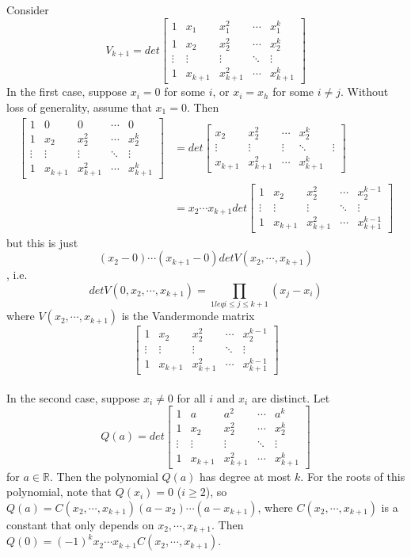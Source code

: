 \documentclass[12pt]{article}
\begin{document}
Consider 
$$V_{k+1} = det \begin{bmatrix} 1 & x_1 & x_1^2 & \cdots & x_1^{k} \\ 1 &x_2 & x_2^2 & \cdots & x_2^{k} \\ \vdots & \vdots & \vdots & \ddots & \vdots \\ 1 &x_{k+1} & x_{k+1}^2 & \cdots & x_{k+1}^{k} \end{bmatrix}$$
In the first case, suppose $x_i = 0$ for some $i$, or $x_i = x_h$ for some $i \neq j$. Without loss of generality, assume that $x_1 = 0$. Then 
\begin{align*} 
\begin{bmatrix} 1 & 0 & 0 & \cdots & 0 \\ 1 &x_2 & x_2^2 & \cdots & x_2^{k} \\ \vdots & \vdots & \vdots & \ddots & \vdots \\ 1 &x_{k+1} & x_{k+1}^2 & \cdots & x_{k+1}^{k} \end{bmatrix} &= det \begin{bmatrix} x_2 & x_2^2 & \cdots & x_2^{k} \\ \vdots & \vdots & \vdots & \ddots & \vdots \\ x_{k+1} & x_{k+1}^2 & \cdots & x_{k+1}^{k} \end{bmatrix}\\
&= x_2 \cdots x_{k+1} det \begin{bmatrix} 1 &x_2 & x_2^2 & \cdots & x_2^{k-1} \\ \vdots & \vdots & \vdots & \ddots & \vdots \\ 1 & x_{k+1} & x_{k+1}^2 & \cdots & x_{k+1}^{k-1} \end{bmatrix}
\end{align*}
but this is just
$$(x_2 - 0) \cdots (x_{k+1} - 0) det V(x_2, \cdots, x_{k+1}) $$,
i.e.
$$det V(0, x_2, \cdots, x_{k+1}) = \prod_{1 leq i \leq j \leq k+1}(x_j - x_i)$$
where $V(x_2, \cdots, x_{k+1})$ is the Vandermonde matrix 
$$\begin{bmatrix} 1 &x_2 & x_2^2 & \cdots & x_2^{k-1} \\ \vdots & \vdots & \vdots & \ddots & \vdots \\ 1 & x_{k+1} & x_{k+1}^2 & \cdots & x_{k+1}^{k-1} \end{bmatrix}$$\\

In the second case, suppose $x_i \neq 0$ for all $i$ and $x_i$ are distinct. Let
$$Q(a) = det \begin{bmatrix} 1 & a & a^2 & \cdots & a^{k} \\ 1 &x_2 & x_2^2 & \cdots & x_2^{k} \\ \vdots & \vdots & \vdots & \ddots & \vdots \\ 1 &x_{k+1} & x_{k+1}^2 & \cdots & x_{k+1}^{k} \end{bmatrix}$$
for $a \in \mathbb{R}$. Then the polynomial $Q(a)$ has degree at most $k$. For the roots of this polynomial, note that $Q(x_i) = 0$ ($i \geq 2$), so $Q(a) = C(x_2, \cdots, x_{k+1}) (a - x_2) \cdots (a - x_{k+1})$, where $C(x_2, \cdots, x_{k+1})$ is a constant that only depends on $x_2, \cdots, x_{k+1}$. Then $Q(0) = (-1)^k x_2 \cdots x_{k+1} C(x_2, \cdots, x_{k+1})$.\\
\end{document}
